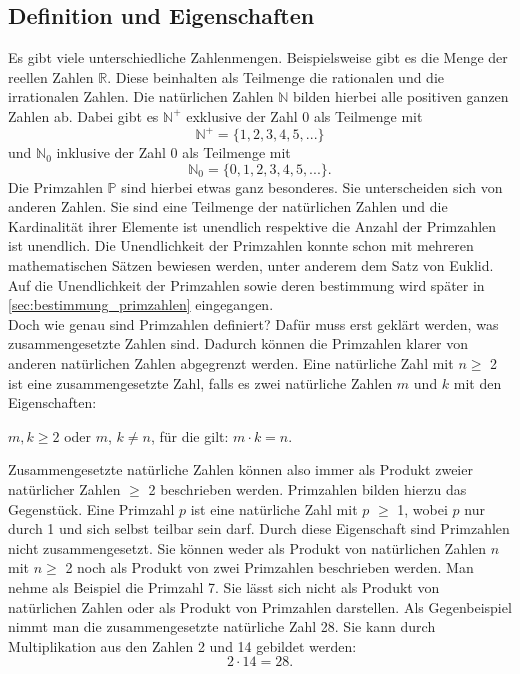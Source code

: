 \subsection{Definition und Eigenschaften}
Es gibt viele unterschiedliche Zahlenmengen. Beispielsweise gibt es die Menge der reellen Zahlen $\mathbb{R}$. Diese beinhalten als Teilmenge die rationalen und die irrationalen Zahlen. Die natürlichen Zahlen $\mathbb{N}$ bilden hierbei alle positiven ganzen Zahlen ab. Dabei gibt es $\mathbb{N^{+}}$ exklusive der Zahl 0 als Teilmenge mit \[\mathbb{N^{+}} = \{1, 2, 3, 4, 5, ...\}\] und $\mathbb{N}_0$ inklusive der Zahl 0 als Teilmenge mit \[\mathbb{N}_0 = \{0, 1, 2, 3, 4, 5, ...\}.\] Die Primzahlen $\mathbb{P}$ sind hierbei etwas ganz besonderes. Sie unterscheiden sich von anderen Zahlen. Sie sind eine Teilmenge der natürlichen Zahlen und die Kardinalität ihrer Elemente ist unendlich respektive die Anzahl der Primzahlen ist unendlich. Die Unendlichkeit der Primzahlen konnte schon mit mehreren mathematischen Sätzen bewiesen werden, unter anderem dem Satz von Euklid. Auf die Unendlichkeit der Primzahlen sowie deren bestimmung wird später in \ref{sec:bestimmung_primzahlen} eingegangen.\\

Doch wie genau sind Primzahlen definiert? Dafür muss erst geklärt werden, was zusammengesetzte Zahlen sind. Dadurch können die Primzahlen klarer von anderen natürlichen Zahlen abgegrenzt werden. Eine natürliche Zahl mit $n \geq$ 2 ist eine zusammengesetzte Zahl, falls es zwei natürliche Zahlen $m$ und $k$ mit den Eigenschaften:

\begin{center}
 $m, k \geq 2$ oder $m$, $k \neq n$, für die gilt: $m \cdot k = n$. 
\end{center}
 
Zusammengesetzte natürliche Zahlen können also immer als Produkt zweier natürlicher Zahlen $\geq$ 2 beschrieben werden. Primzahlen bilden hierzu das Gegenstück. Eine Primzahl $p$ ist eine natürliche Zahl mit $p$ $\geq$ 1, wobei $p$ nur durch 1 und sich selbst teilbar sein darf. Durch diese Eigenschaft sind Primzahlen nicht zusammengesetzt. Sie können weder als Produkt von natürlichen Zahlen $n$ mit $n \geq$ 2 noch als Produkt von zwei Primzahlen beschrieben werden. Man nehme als Beispiel die Primzahl 7. Sie lässt sich nicht als Produkt von natürlichen Zahlen oder als Produkt von Primzahlen darstellen. Als Gegenbeispiel nimmt man die zusammengesetzte natürliche Zahl 28. Sie kann durch Multiplikation aus den Zahlen 2 und 14 gebildet werden: \[2 \cdot 14=28.\]

